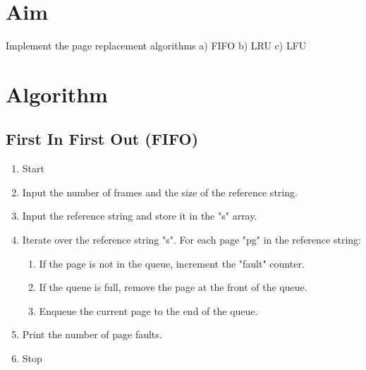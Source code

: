 
\section{Aim}
Implement the page replacement algorithms a) FIFO b) LRU c) LFU

\section{Algorithm}
\subsection{First In First Out (FIFO)}
\begin{enumerate}
   \item Start
   \item Input the number of frames and the size of the reference string.
   \item Input the reference string and store it in the "s" array.
   \item Iterate over the reference string "s". For each page "pg" in the reference string:
   \begin{enumerate}
       \item If the page is not in the queue, increment the "fault" counter.
       \item If the queue is full, remove the page at the front of the queue.
       \item Enqueue the current page to the end of the queue.
   \end{enumerate}
   \item Print the number of page faults.
   \item Stop
\end{enumerate}

